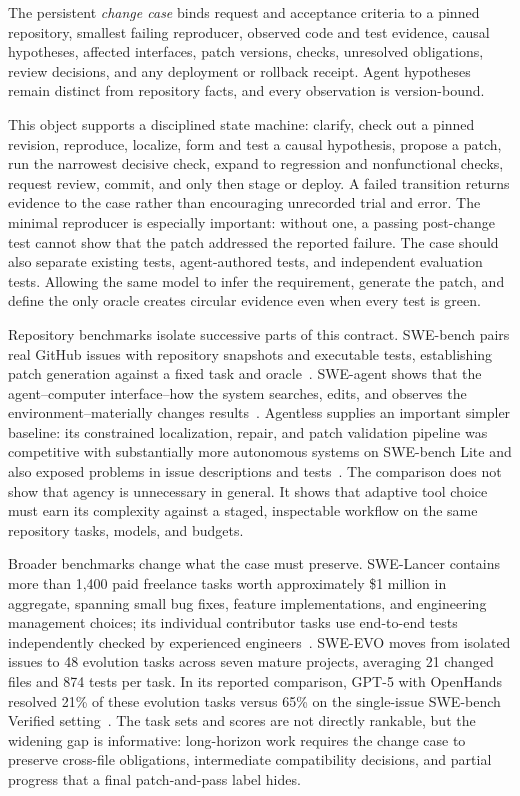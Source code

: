 The persistent \emph{change case} binds request and acceptance criteria to a pinned repository, smallest failing reproducer, observed code and test evidence, causal hypotheses, affected interfaces, patch versions, checks, unresolved obligations, review decisions, and any deployment or rollback receipt. Agent hypotheses remain distinct from repository facts, and every observation is version-bound.

This object supports a disciplined state machine: clarify, check out a pinned revision, reproduce, localize, form and test a causal hypothesis, propose a patch, run the narrowest decisive check, expand to regression and nonfunctional checks, request review, commit, and only then stage or deploy. A failed transition returns evidence to the case rather than encouraging unrecorded trial and error. The minimal reproducer is especially important: without one, a passing post-change test cannot show that the patch addressed the reported failure. The case should also separate existing tests, agent-authored tests, and independent evaluation tests. Allowing the same model to infer the requirement, generate the patch, and define the only oracle creates circular evidence even when every test is green.

Repository benchmarks isolate successive parts of this contract. SWE-bench pairs real GitHub issues with repository snapshots and executable tests, establishing patch generation against a fixed task and oracle~\cite{jimenez2024swebench}. SWE-agent shows that the agent--computer interface--how the system searches, edits, and observes the environment--materially changes results~\cite{yang2024sweagent}. Agentless supplies an important simpler baseline: its constrained localization, repair, and patch validation pipeline was competitive with substantially more autonomous systems on SWE-bench Lite and also exposed problems in issue descriptions and tests~\cite{xia2024agentless}. The comparison does not show that agency is unnecessary in general. It shows that adaptive tool choice must earn its complexity against a staged, inspectable workflow on the same repository tasks, models, and budgets.

Broader benchmarks change what the case must preserve. SWE-Lancer contains more than 1,400 paid freelance tasks worth approximately \$1 million in aggregate, spanning small bug fixes, feature implementations, and engineering management choices; its individual contributor tasks use end-to-end tests independently checked by experienced engineers~\cite{miserendino2025swelancer}. SWE-EVO moves from isolated issues to 48 evolution tasks across seven mature projects, averaging 21 changed files and 874 tests per task. In its reported comparison, GPT-5 with OpenHands resolved 21\% of these evolution tasks versus 65\% on the single-issue SWE-bench Verified setting~\cite{thai2025sweevo}. The task sets and scores are not directly rankable, but the widening gap is informative: long-horizon work requires the change case to preserve cross-file obligations, intermediate compatibility decisions, and partial progress that a final patch-and-pass label hides.

